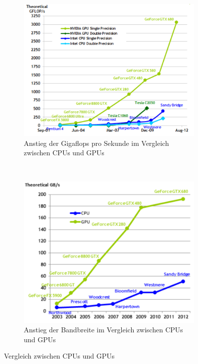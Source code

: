 \begin{figure}
	\begin{subfigure}[t]{0.5\textwidth}
		\centering
		\includegraphics[width=\textwidth]{images/gflops_cpu_vs_gpu}
                \caption{Anstieg der Gigaflops pro Sekunde im Vergleich zwischen CPUs und GPUs}
\label{fig:opencl_gflops_gpu_vs_cpu}
	\end{subfigure}
    ~
	\begin{subfigure}[t]{0.5\textwidth}
		\centering
		\includegraphics[width=\textwidth]{images/gbs_cpu_vs_gpu}
                \caption{Anstieg der Bandbreite im Vergleich zwischen CPUs und GPUs}
\label{fig:opencl_gbs_gpu_vs_cpu}
	\end{subfigure}
        \caption{Vergleich zwischen CPUs und GPUs}
\end{figure}


